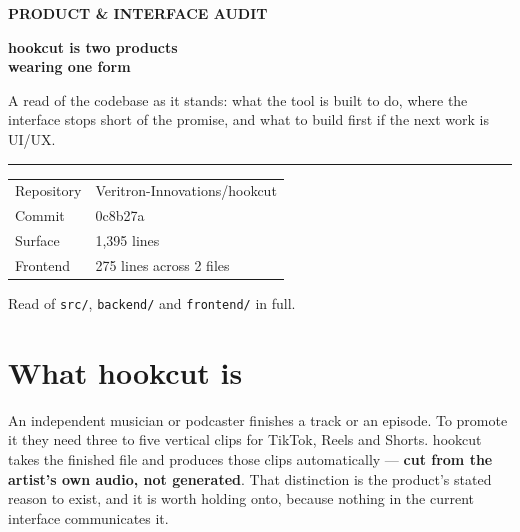 \documentclass[11pt,a4paper]{article}
\newcommand{\code}[1]{\texttt{\small #1}}
\newcommand{\eyebrow}[1]{%
  {\sffamily\bfseries\footnotesize\color{accent}\MakeUppercase{#1}}\par\vspace{2pt}}
\begin{document}
\begin{titlepage}
\vspace*{2.2cm}
\eyebrow{Product \& interface audit}
\vspace{4pt}

{\sffamily\bfseries\fontsize{34}{38}\selectfont
hookcut is two products\\
\textcolor{muted}{wearing one form}\par}

\vspace{16pt}
{\large\color{ink2}
A read of the codebase as it stands: what the tool is built to do, where the
interface stops short of the promise, and what to build first if the next work
is UI/UX.\par}

\vspace{26pt}
\textcolor{rule}{\rule{\linewidth}{0.6pt}}
\vspace{10pt}

{\ttfamily\small\color{muted}
\begin{tabular}{@{}ll@{}}
Repository & Veritron-Innovations/hookcut \\
Commit     & 0c8b27a \\
Surface    & 1{,}395 lines \\
Frontend   & 275 lines across 2 files \\
\end{tabular}\par}

\vfill
{\ttfamily\scriptsize\color{muted}
Read of \code{src/}, \code{backend/} and \code{frontend/} in full.\par}
\end{titlepage}

\tableofcontents
\newpage

\section{What hookcut is}

An independent musician or podcaster finishes a track or an episode. To promote
it they need three to five vertical clips for TikTok, Reels and Shorts. hookcut
takes the finished file and produces those clips automatically --- \textbf{cut
from the artist's own audio, not generated}. That distinction is the product's
stated reason to exist, and it is worth holding onto, because nothing in the
current interface communicates it.
\end{document}
